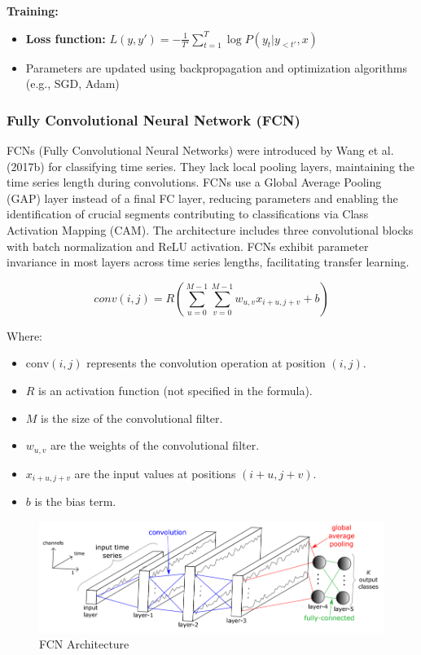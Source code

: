 \documentclass{ieeeojies}
\begin{document}
\textbf{Training:}
\begin{itemize}
    \item \textbf{Loss function:} $L(y, y') = -\frac{1}{T'} \sum_{t=1}^{T} \log P(y_t|y_{<t'}, x)$
    \item Parameters are updated using backpropagation and optimization algorithms (e.g., SGD, Adam)
\end{itemize}

\subsubsection{\textbf{Fully Convolutional Neural Network (FCN)}}
\hspace{1em}FCNs (Fully Convolutional Neural Networks) were introduced by Wang et al. (2017b) for classifying time series. They lack local pooling layers, maintaining the time series length during convolutions. FCNs use a Global Average Pooling (GAP) layer instead of a final FC layer, reducing parameters and enabling the identification of crucial segments contributing to classifications via Class Activation Mapping (CAM). The architecture includes three convolutional blocks with batch normalization and ReLU activation. FCNs exhibit parameter invariance in most layers across time series lengths, facilitating transfer learning.\cite{a16}

\[conv(i,j) = R( \sum_{u=0}^{M-1} \sum_{v=0}^{M-1} w_{u,v} x_{i+u,j+v} +b)\]

Where:
\begin{itemize}
    \item \( \text{conv}(i, j) \) represents the convolution operation at position \((i, j)\).
    \item \( R \) is an activation function (not specified in the formula).
    \item \( M \) is the size of the convolutional filter.
    \item \( w_{u,v} \) are the weights of the convolutional filter.
    \item \( x_{i+u, j+v} \) are the input values at positions \((i+u, j+v)\).
    \item \( b \) is the bias term.
\end{itemize}

\begin{figure}[H]
    \centering
    \includegraphics[width=1\linewidth]{FCN_struc.png}
    \caption{FCN Architecture}
    \label{fig:enter-label}
\end{figure}
\end{document}
